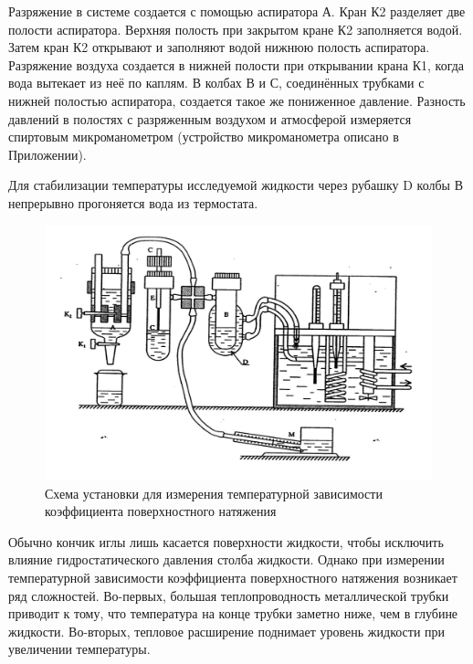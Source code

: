 \documentclass[a4paper]{article}
\begin{document}
Разряжение в системе создается с помощью аспиратора А. Кран К2 разделяет две полости аспиратора. Верхняя полость при закрытом кране К2  заполняется водой. Затем кран К2 открывают и заполняют водой  нижнюю полость  аспиратора.  Разряжение воздуха создается в нижней полости  при открывании крана К1, когда  вода вытекает из неё по каплям. В колбах В и С, соединённых трубками с нижней полостью аспиратора,  создается такое же пониженное давление. Разность давлений в полостях с разряженным воздухом и атмосферой измеряется спиртовым микроманометром (устройство микроманометра описано в Приложении).  

Для стабилизации температуры исследуемой жидкости через рубашку D колбы В непрерывно прогоняется вода из термостата. 
\begin{figure}[H]
        \centering
        \includegraphics[scale=0.8]{Pictures/pic1.jpg}
        \caption{
        Схема установки для измерения температурной зависимости 
        коэффициента поверхностного натяжения
        }
 \end{figure} 
Обычно кончик иглы лишь касается поверхности жидкости, чтобы исключить влияние гидростатического давления столба жидкости. Однако при измерении температурной зависимости коэффициента поверхностного натяжения возникает ряд сложностей. Во-первых, большая теплопроводность металлической трубки приводит к тому, что температура на конце трубки заметно ниже, чем в глубине жидкости. Во-вторых, тепловое расширение поднимает уровень жидкости при увеличении температуры.  
\end{document}
